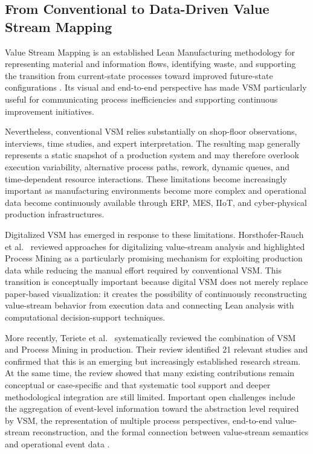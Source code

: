 \documentclass[pdflatex,iicol,Numbered,sn-basic]{sn-jnl}
\begin{document}
\subsection{From Conventional to Data-Driven Value Stream Mapping}

Value Stream Mapping is an established Lean Manufacturing methodology for
representing material and information flows, identifying waste, and supporting
the transition from current-state processes toward improved future-state
configurations \cite{RotherShook2003}. Its visual and end-to-end perspective has
made VSM particularly useful for communicating process inefficiencies and
supporting continuous improvement initiatives.

Nevertheless, conventional VSM relies substantially on shop-floor observations,
interviews, time studies, and expert interpretation. The resulting map generally
represents a static snapshot of a production system and may therefore overlook
execution variability, alternative process paths, rework, dynamic queues, and
time-dependent resource interactions. These limitations become increasingly
important as manufacturing environments become more complex and operational data
become continuously available through ERP, MES, IIoT, and cyber-physical
production infrastructures.

Digitalized VSM has emerged in response to these limitations. Horsthofer-Rauch et al.~\cite{HorsthoferRauch2022DigitalizedVSM} reviewed approaches for
digitalizing value-stream analysis and highlighted Process Mining as a
particularly promising mechanism for exploiting production data while reducing
the manual effort required by conventional VSM. This transition is conceptually
important because digital VSM does not merely replace paper-based visualization:
it creates the possibility of continuously reconstructing value-stream behavior
from execution data and connecting Lean analysis with computational
decision-support techniques.

More recently, Teriete et al.~\cite{Teriete2026VSMProcessMining} systematically
reviewed the combination of VSM and Process Mining in production. Their review
identified 21 relevant studies and confirmed that this is an emerging but
increasingly established research stream. At the same time, the review showed
that many existing contributions remain conceptual or case-specific and that
systematic tool support and deeper methodological integration are still limited.
Important open challenges include the aggregation of event-level information
toward the abstraction level required by VSM, the representation of multiple
process perspectives, end-to-end value-stream reconstruction, and the formal
connection between value-stream semantics and operational event data
\cite{Teriete2026VSMProcessMining}.
\end{document}

